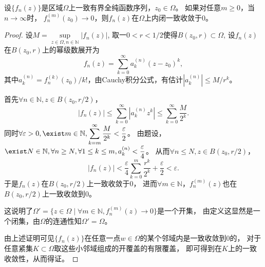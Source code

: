 \begin{2}
    设$\{f_n(z)\}$是区域$\Omega$上一致有界全纯函数序列，$z_0\in\Omega$。
    如果对任意$m\geq0$，当$n\rightarrow\infty$时，
    $f_n^{(m)}(z_0)\rightarrow0$，则$f_n(z)$在$\Omega$上内闭一致收敛于$0$。
\end{2}
\begin{proof}
    设$M=\sup\limits_{z\in\Omega,n\in\mathbb{N}}|f_n(z)|$,
    取一$0<r<1/2$使得$B(z_0,r)\subset\Omega$,
    设$f_n(z)$在$B(z_0,r)$上的幂级数展开为
    \[f_n(z)=\sum_{k=0}^{\infty}a_k^{(n)}(z-z_0)^k,\]
    其中$a_k^{(n)}=f_n^{(k)}(z_0)/k!$，由Cauchy积分公式，有估计$|a_k^{(n)}|\leq M/r^k$。

    首先$\forall n\in\mathbb{N},z\in B(z_0,r/2)$，
    \[|f_n(z)|\leq\sum_{k=0}^{\infty}|a_k^{(n)}z^k|\leq\sum_{k=0}^{\infty}\frac{M}{2^k}.\]
    同时$\forall \varepsilon>0,\exist m\in\mathbb{N},\displaystyle\sum_{k=m}^{\infty}\frac{M}{2^k}<\frac{\varepsilon}{2}$。
    由题设，$\exist N\in\mathbb{N},\forall n\geq N,\forall 1\leq k\leq m,a_k^{(n)}<\dfrac{\varepsilon}{4}$。
    从而$\forall n\leq N,z\in B(z_0,r/2)$，
    \[|f_n(z)|<\frac{\varepsilon}{4}\sum_{k=0}^m\frac{r^k}{2^k}+\frac{\varepsilon}{2}<\varepsilon.\]
    于是${f_n(z)}$在$B(z_0,r/2)$上一致收敛于$0$，
    进而$\forall m\in\mathbb{N}$，${f_n^{(m)}(z)}$也在$B(z_0,r/2)$上一致收敛到$0$。

    这说明了$\Omega'=\{z\in\Omega\mid\forall m\in\mathbb{N},f_n^{(m)}(z)\rightarrow0\}$是一个开集，
    由定义这显然是一个闭集，由$\Omega$的连通性知$\Omega'=\Omega$。

    由上述证明可见$\{f_n(z)\}$在任意一点$w\in\Omega$的某个邻域内是一致收敛到$0$的，
    对于任意紧集$K\subset\Omega$取这些小邻域组成的开覆盖的有限覆盖，
    即可得到在$K$上的一致收敛性，从而得证。
\end{proof}


